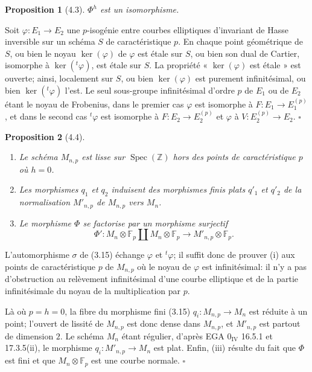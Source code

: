 \documentclass[10pt]{article}
\newcommand{\F}{\mathbb F}
\newcommand{\Z}{\mathbb Z}
\newcommand{\Spec}{\operatorname{Spec}}
\newcommand{\QED}{\hfill$\square$}
\newtheorem*{proposition}{Proposition}
\begin{document}
\begin{proposition}[4.3]
$\Phi^h$ est un isomorphisme.
\end{proposition}

Soit $\varphi:E_1\to E_2$ une $p$-isogénie entre courbes elliptiques d'invariant de Hasse inversible sur un schéma $S$ de caractéristique $p$. En chaque point géométrique de $S$, ou bien le noyau $\ker(\varphi)$ de $\varphi$ est étale sur $S$, ou bien son dual de Cartier, isomorphe à $\ker({}^{t}\!\varphi)$, est étale sur $S$. La propriété « $\ker(\varphi)$ est étale » est ouverte; ainsi, localement sur $S$, ou bien $\ker(\varphi)$ est purement infinitésimal, ou bien $\ker({}^{t}\!\varphi)$ l'est. Le seul sous-groupe infinitésimal d'ordre $p$ de $E_1$ ou de $E_2$ étant le noyau de Frobenius, dans le premier cas $\varphi$ est isomorphe à $F:E_1\to E_1^{(p)}$, et dans le second cas ${}^{t}\!\varphi$ est isomorphe à $F:E_2\to E_2^{(p)}$ et $\varphi$ à $V:E_2^{(p)}\to E_2$. \QED

\begin{proposition}[4.4]
\leavevmode
\begin{enumerate}[label=(\roman*)]
\item Le schéma $M_{n,p}$ est lisse sur $\Spec(\Z)$ hors des points de caractéristique $p$ où $h=0$.
\item Les morphismes $q_1$ et $q_2$ induisent des morphismes finis plats $q'_1$ et $q'_2$ de la normalisation $M'_{n,p}$ de $M_{n,p}$ vers $M_n$.
\item Le morphisme $\Phi$ se factorise par un morphisme surjectif
\[
\Phi':M_n\otimes\F_p\coprod M_n\otimes\F_p\to M'_{n,p}\otimes\F_p.
\]
\end{enumerate}
\end{proposition}

L'automorphisme $\sigma$ de (3.15) échange $\varphi$ et ${}^{t}\!\varphi$; il suffit donc de prouver (i) aux points de caractéristique $p$ de $M_{n,p}$ où le noyau de $\varphi$ est infinitésimal: il n'y a pas d'obstruction au relèvement infinitésimal d'une courbe elliptique et de la partie infinitésimale du noyau de la multiplication par $p$.

Là où $p=h=0$, la fibre du morphisme fini (3.15) $q_i:M_{n,p}\to M_n$ est réduite à un point; l'ouvert de lissité de $M_{n,p}$ est donc dense dans $M_{n,p}$, et $M'_{n,p}$ est partout de dimension $2$. Le schéma $M_n$ étant régulier, d'après EGA $0_{\mathrm{IV}}$ 16.5.1 et 17.3.5(ii), le morphisme $q_i:M'_{n,p}\to M_n$ est plat. Enfin, (iii) résulte du fait que $\Phi$ est fini et que $M_n\otimes\F_p$ est une courbe normale. \QED
\end{document}
